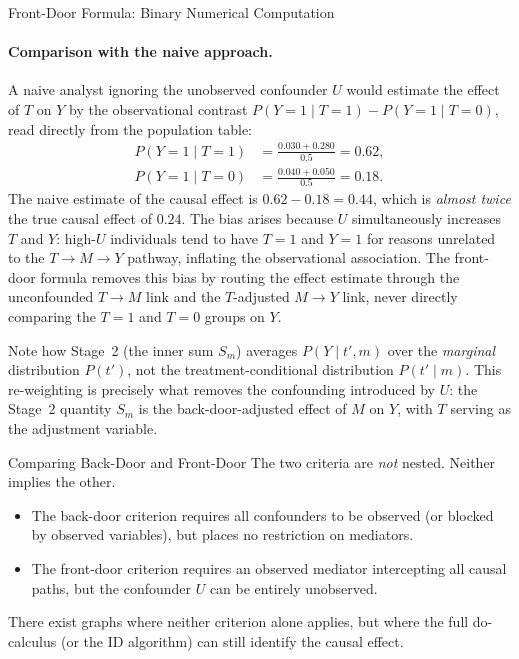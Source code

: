 \documentclass[master.tex]{subfiles}
\begin{document}
\begin{example}{Front-Door Formula: Binary Numerical Computation}
\paragraph{Comparison with the naive approach.}
A naive analyst ignoring the unobserved confounder $U$ would estimate the
effect of $T$ on $Y$ by the observational contrast
$P(Y{=}1 \mid T{=}1) - P(Y{=}1 \mid T{=}0)$, read directly from the
population table:
\begin{align*}
  P(Y{=}1 \mid T{=}1)
    &= \frac{0.030 + 0.280}{0.5} = 0.62, \\[4pt]
  P(Y{=}1 \mid T{=}0)
    &= \frac{0.040 + 0.050}{0.5} = 0.18.
\end{align*}
The naive estimate of the causal effect is $0.62 - 0.18 = 0.44$, which is
\emph{almost twice} the true causal effect of $0.24$.  The bias arises
because $U$ simultaneously increases $T$ and $Y$: high-$U$ individuals
tend to have $T{=}1$ and $Y{=}1$ for reasons unrelated to the $T\to M\to Y$
pathway, inflating the observational association.  The front-door formula
removes this bias by routing the effect estimate through the unconfounded
$T\to M$ link and the $T$-adjusted $M\to Y$ link, never directly comparing
the $T{=}1$ and $T{=}0$ groups on $Y$.

Note how Stage~2 (the inner sum $S_m$) averages $P(Y\mid t', m)$ over the
\emph{marginal} distribution $P(t')$, not the treatment-conditional
distribution $P(t' \mid m)$.  This re-weighting is precisely what removes
the confounding introduced by $U$: the Stage~2 quantity $S_m$ is the
back-door-adjusted effect of $M$ on $Y$, with $T$ serving as the
adjustment variable.
\end{example}

\begin{warn}{Comparing Back-Door and Front-Door}
The two criteria are \emph{not} nested.  Neither implies the other.
\begin{itemize}
  \item The back-door criterion requires all confounders to be observed
        (or blocked by observed variables), but places no restriction on
        mediators.
  \item The front-door criterion requires an observed mediator intercepting
        all causal paths, but the confounder $U$ can be entirely
        unobserved.
\end{itemize}
There exist graphs where neither criterion alone applies, but where the
full do-calculus (or the ID algorithm) can still identify the causal
effect.
\end{warn}
\end{document}
